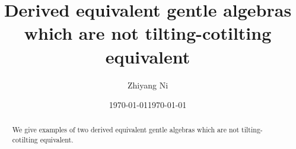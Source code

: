 \documentclass[11pt,reqno]{amsart}
\theoremstyle{plain}
\theoremstyle{definition}
\theoremstyle{remark}
\numberwithin{equation}{section}
\begin{document}
\title[Derived equivalent but not tilting-cotilting equivalent]{Derived equivalent gentle algebras which are not tilting-cotilting equivalent}
\author{Zhiyang Ni}
\address{University of Science and Technology of China, Hefei 230026, Anhui, PR China}


\date{\today}

\date{\today}

\begin{abstract}
    We give examples of two derived equivalent gentle algebras which are not tilting-cotilting equivalent.
\end{abstract}

\maketitle
\tableofcontents
\end{document}
